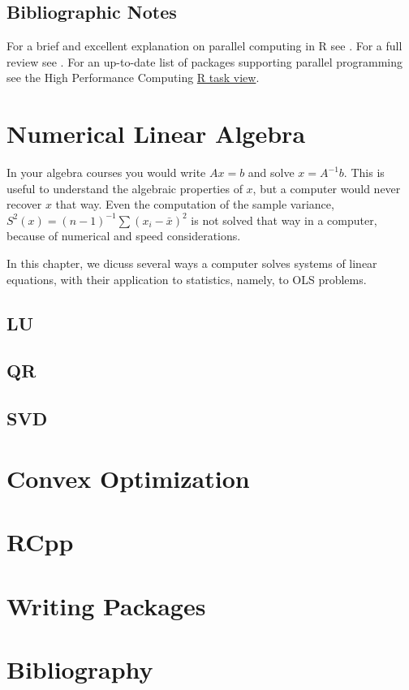 \documentclass[]{book}
\theoremstyle{definition}
\theoremstyle{definition}
\theoremstyle{remark}
\begin{document}
\section{Bibliographic Notes}\label{bibliographic-notes-12}

For a brief and excellent explanation on parallel computing in R see
\citet{schmidberger2009state}. For a full review see
\citet{chapple2016mastering}. For an up-to-date list of packages
supporting parallel programming see the High Performance Computing
\href{https://cran.r-project.org/web/views/HighPerformanceComputing.html}{R
task view}.

\chapter{Numerical Linear Algebra}\label{algebra}

In your algebra courses you would write \(Ax=b\) and solve
\(x=A^{-1}b\). This is useful to understand the algebraic properties of
\(x\), but a computer would never recover \(x\) that way. Even the
computation of the sample variance,
\(S^2(x)=(n-1)^{-1}\sum (x_i-\bar x)^2\) is not solved that way in a
computer, because of numerical and speed considerations.

In this chapter, we dicuss several ways a computer solves systems of
linear equations, with their application to statistics, namely, to OLS
problems.

\section{LU}\label{lu}

\section{QR}\label{qr}

\section{SVD}\label{svd}

\chapter{Convex Optimization}\label{convex}

\chapter{RCpp}\label{rcpp}

\chapter{Writing Packages}\label{package}

\chapter{Bibliography}\label{bib}


\end{document}
